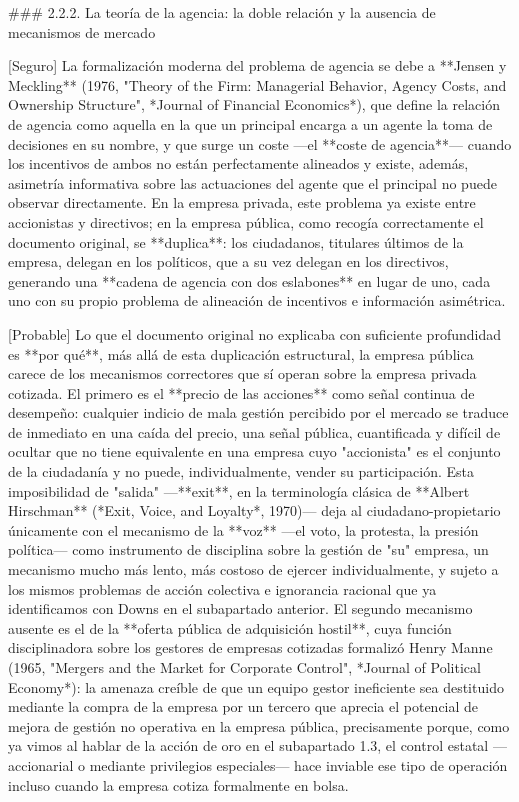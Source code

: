 \documentclass[10pt,a4paper]{article}
\begin{document}
### 2.2.2. La teoría de la agencia: la doble relación y la ausencia de mecanismos de mercado

[Seguro] La formalización moderna del problema de agencia se debe a **Jensen y Meckling** (1976, "Theory of the Firm: Managerial Behavior, Agency Costs, and Ownership Structure", *Journal of Financial Economics*), que define la relación de agencia como aquella en la que un principal encarga a un agente la toma de decisiones en su nombre, y que surge un coste —el **coste de agencia**— cuando los incentivos de ambos no están perfectamente alineados y existe, además, asimetría informativa sobre las actuaciones del agente que el principal no puede observar directamente. En la empresa privada, este problema ya existe entre accionistas y directivos; en la empresa pública, como recogía correctamente el documento original, se **duplica**: los ciudadanos, titulares últimos de la empresa, delegan en los políticos, que a su vez delegan en los directivos, generando una **cadena de agencia con dos eslabones** en lugar de uno, cada uno con su propio problema de alineación de incentivos e información asimétrica.

[Probable] Lo que el documento original no explicaba con suficiente profundidad es **por qué**, más allá de esta duplicación estructural, la empresa pública carece de los mecanismos correctores que sí operan sobre la empresa privada cotizada. El primero es el **precio de las acciones** como señal continua de desempeño: cualquier indicio de mala gestión percibido por el mercado se traduce de inmediato en una caída del precio, una señal pública, cuantificada y difícil de ocultar que no tiene equivalente en una empresa cuyo "accionista" es el conjunto de la ciudadanía y no puede, individualmente, vender su participación. Esta imposibilidad de "salida" —**exit**, en la terminología clásica de **Albert Hirschman** (*Exit, Voice, and Loyalty*, 1970)— deja al ciudadano-propietario únicamente con el mecanismo de la **voz** —el voto, la protesta, la presión política— como instrumento de disciplina sobre la gestión de "su" empresa, un mecanismo mucho más lento, más costoso de ejercer individualmente, y sujeto a los mismos problemas de acción colectiva e ignorancia racional que ya identificamos con Downs en el subapartado anterior. El segundo mecanismo ausente es el de la **oferta pública de adquisición hostil**, cuya función disciplinadora sobre los gestores de empresas cotizadas formalizó Henry Manne (1965, "Mergers and the Market for Corporate Control", *Journal of Political Economy*): la amenaza creíble de que un equipo gestor ineficiente sea destituido mediante la compra de la empresa por un tercero que aprecia el potencial de mejora de gestión no operativa en la empresa pública, precisamente porque, como ya vimos al hablar de la acción de oro en el subapartado 1.3, el control estatal —accionarial o mediante privilegios especiales— hace inviable ese tipo de operación incluso cuando la empresa cotiza formalmente en bolsa.
\end{document}
